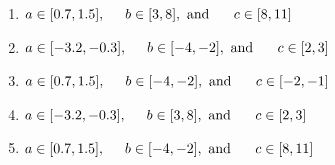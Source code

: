 \documentclass[14pt]{extbook}
\begin{document}
\begin{enumerate}
{\begin{center}
\end{center}
\begin{enumerate}[label=\Alph*.]
\item \( a \in [0.7, 1.5], \hspace*{5mm} b \in [3, 8], \text{ and } \hspace*{5mm} c \in [8, 11] \)
\item \( a \in [-3.2, -0.3], \hspace*{5mm} b \in [-4, -2], \text{ and } \hspace*{5mm} c \in [2, 3] \)
\item \( a \in [0.7, 1.5], \hspace*{5mm} b \in [-4, -2], \text{ and } \hspace*{5mm} c \in [-2, -1] \)
\item \( a \in [-3.2, -0.3], \hspace*{5mm} b \in [3, 8], \text{ and } \hspace*{5mm} c \in [2, 3] \)
\item \( a \in [0.7, 1.5], \hspace*{5mm} b \in [-4, -2], \text{ and } \hspace*{5mm} c \in [8, 11] \)

\end{enumerate} }
\end{enumerate}
\end{document}
